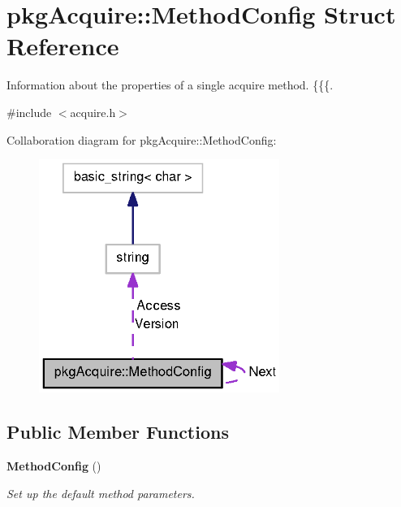 \section{pkg\-Acquire\-:\-:\-Method\-Config \-Struct \-Reference}
\label{structpkgAcquire_1_1MethodConfig}


\-Information about the properties of a single acquire method. \{\{\{.  




{\ttfamily \#include $<$acquire.\-h$>$}



\-Collaboration diagram for pkg\-Acquire\-:\-:\-Method\-Config\-:
\nopagebreak
\begin{figure}[H]
\begin{center}
\leavevmode
\includegraphics[width=222pt]{structpkgAcquire_1_1MethodConfig__coll__graph}
\end{center}
\end{figure}
\subsection*{\-Public \-Member \-Functions}
\begin{DoxyCompactItemize}
\item 
{\bf \-Method\-Config} ()
\begin{DoxyCompactList}\small\item\em \-Set up the default method parameters. \end{DoxyCompactList}\end{DoxyCompactItemize}

